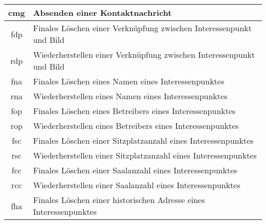 \begin{longtable}[H]{|c|p{12cm}|}
		cmg                 & Absenden einer Kontaktnachricht                                                                                                                    \\ \hline
		fdp                 & Finales Löschen einer Verknüpfung zwischen Interessenpunkt und Bild                                                                                \\ \hline
		rdp                 & Wiederherstellen einer Verknüpfung zwischen Interessenpunkt und Bild                                                                               \\ \hline
		fna                 & Finales Löschen eines Namen eines Interessenpunktes                                                                                                \\ \hline
		rna                 & Wiederherstellen eines Namen eines Interessenpunktes                                                                                               \\ \hline
		fop                 & Finales Löschen eines Betreibers eines Interessenpunktes                                                                                           \\ \hline
		rop                 & Wiederherstellen eines Betreibers eines Interessenpunktes                                                                                          \\ \hline
		fsc                 & Finales Löschen einer Sitzplatzanzahl eines Interessenpunktes                                                                                      \\ \hline
		rsc                 & Wiederherstellen einer Sitzplatzanzahl eines Interessenpunktes                                                                                     \\ \hline
		fcc                 & Finales Löschen einer Saalanzahl eines Interessenpunktes                                                                                           \\ \hline
		rcc                 & Wiederherstellen einer Saalanzahl eines Interessenpunktes                                                                                          \\ \hline
		fha                 & Finales Löschen einer historischen Adresse eines Interessenpunktes                                                                                 \\ \hline

\end{longtable}
